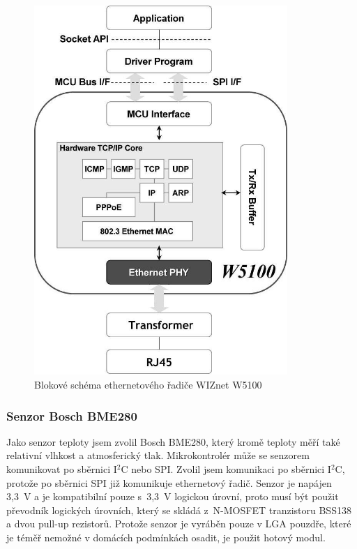 \documentclass[12pt,a4paper]{article}
\begin{document}
\begin{figure}[H]
\centering
\label{fig:w5100-block-diagram}
\includegraphics[width = 96mm]{../img/w5100-block-diagram.png}
\caption{Blokové schéma ethernetového řadiče WIZnet W5100}
\end{figure}

\newpage

\subsubsection{Senzor Bosch BME280}

Jako senzor teploty jsem zvolil Bosch BME280, který kromě teploty měří také relativní vlhkost a atmosferický tlak. Mikrokontrolér může se senzorem komunikovat po sběrnici I$^{2}$C nebo SPI. Zvolil jsem komunikaci po sběrnici I$^{2}$C, protože po sběrnici SPI již komunikuje ethernetový řadič. Senzor je napájen 3,3~V a je kompatibilní pouze s~3,3~V logickou úrovní, proto musí být použit převodník logických úrovních, který se skládá z~N-MOSFET tranzistoru BSS138 a dvou pull-up rezistorů. Protože senzor je vyráběn pouze v LGA pouzdře, které je téměř nemožné v domácích podmínkách osadit, je použit hotový modul.
\end{document}
